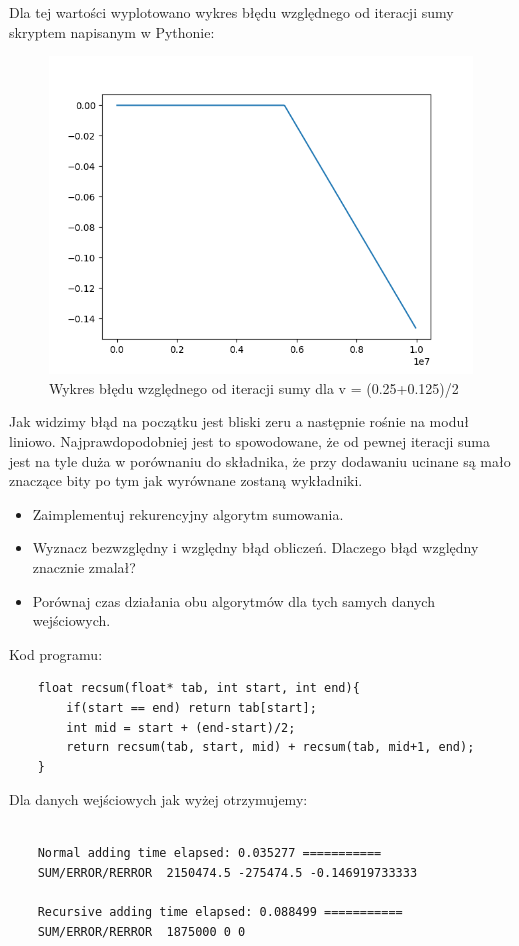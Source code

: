 \documentclass{article}
\begin{document}
Dla tej wartości wyplotowano wykres błędu względnego od iteracji sumy skryptem napisanym w Pythonie:
\begin{figure}[!ht]
	\centering
	\includegraphics[width=.7\linewidth]{img/plot_1.png}
	\caption{Wykres błędu względnego od iteracji sumy dla v = (0.25+0.125)/2}
\end{figure}
	Jak widzimy błąd na początku jest bliski zeru a następnie rośnie na moduł liniowo.
	Najprawdopodobniej jest to spowodowane, że od pewnej iteracji suma jest na tyle duża w porównaniu do składnika, że przy dodawaniu ucinane są mało znaczące bity po tym jak wyrównane zostaną wykładniki.
\begin{itemize}
	\item	Zaimplementuj rekurencyjny algorytm sumowania.
	\item Wyznacz bezwzględny i względny błąd obliczeń. Dlaczego błąd względny znacznie zmalał?
	\item Porównaj czas działania obu algorytmów dla tych samych danych wejściowych.
	
	
\end{itemize}

Kod programu:

\begin{verbatim}
	float recsum(float* tab, int start, int end){
		if(start == end) return tab[start];
		int mid = start + (end-start)/2;
		return recsum(tab, start, mid) + recsum(tab, mid+1, end);
	}
\end{verbatim}

Dla danych wejściowych jak wyżej otrzymujemy:
\begin{lstlisting}
	
	Normal adding time elapsed: 0.035277 ===========
	SUM/ERROR/RERROR  2150474.5 -275474.5 -0.146919733333
	
	Recursive adding time elapsed: 0.088499 ===========
	SUM/ERROR/RERROR  1875000 0 0
\end{lstlisting}
\end{document}
